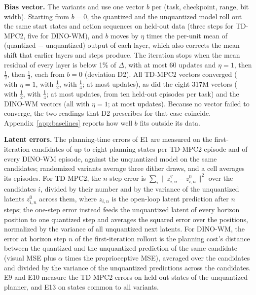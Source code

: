 \textbf{Bias vector.} The variants \detbc and \shiterb use one vector $b$ per (task, checkpoint, range, bit width). Starting from $b=0$, the quantized and the unquantized model roll out the same start states and action sequences on held-out data (three steps for TD-MPC2, five for DINO-WM), and $b$ moves by $\eta$ times the per-unit mean of (quantized $-$ unquantized) output of each layer, which also corrects the mean shift that earlier layers and steps produce. The iteration stops when the mean residual of every layer is below 1\% of $\Delta$, with at most 60 updates and $\eta=1$, then $\tfrac12$, then $\tfrac14$, each from $b=0$ (deviation D2). All  TD-MPC2 vectors converged ( with $\eta=1$,  with $\tfrac12$,  with $\tfrac14$; at most  updates), as did the eight 317M vectors ( with $\tfrac12$,  with $\tfrac14$; at most  updates, from ten held-out episodes per task) and the  DINO-WM vectors (all with $\eta=1$; at most  updates). Because no vector failed to converge, the two readings that D2 prescribes for that case coincide. Appendix~\ref{app:baselines} reports how well $b$ fits outside its data.

\textbf{Latent errors.} The planning-time errors of E1 are measured on the first-iteration candidates of up to eight planning states per TD-MPC2 episode and of every DINO-WM episode, against the unquantized model on the same candidates; randomized variants average three dither draws, and a cell averages its episodes. For TD-MPC2, the $n$-step error is $\sum_i\|z^{q}_{i,n}-z^{0}_{i,n}\|^2$ over the candidates $i$, divided by their number and by the variance of the unquantized latents $z^{0}_{i,n}$ across them, where $z_{i,n}$ is the open-loop latent prediction after $n$ steps; the one-step error instead feeds the unquantized latent of every horizon position to one quantized step and averages the squared error over the positions, normalized by the variance of all unquantized next latents. For DINO-WM, the error at horizon step $n$ of the first-iteration rollout is the planning cost's distance between the quantized and the unquantized prediction of the same candidate (visual MSE plus $\alpha$ times the proprioceptive MSE), averaged over the candidates and divided by the variance of the unquantized predictions across the candidates. E9 and E10 measure the TD-MPC2 errors on held-out states of the unquantized planner, and E13 on states common to all variants.

